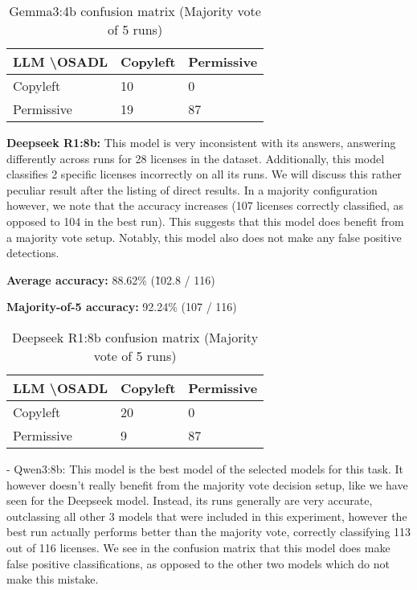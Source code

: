 \begin{table}[h]
	\caption{Gemma3:4b confusion matrix (Majority vote of 5 runs)}
	\label{tab:gemma3-confmatrix}
	\centering
	\begin{tabular}{l|ll}
		\hline
		\textbf{LLM \textbackslash OSADL} & Copyleft & Permissive \\ \hline
		Copyleft & 10 & 0 \\
		Permissive & 19 & 87 \\\hline
	\end{tabular}
\end{table}

\textbf{Deepseek R1:8b:} This model is very inconsistent with its answers, answering differently across runs for 28 licenses in the dataset. Additionally, this model classifies 2 specific licenses incorrectly on all its runs. We will discuss this rather peculiar result after the listing of direct results. In a majority configuration however, we note that the accuracy increases (107 licenses correctly classified, as opposed to 104 in the best run). This suggests that this model does benefit from a majority vote setup. Notably, this model also does not make any false positive detections.

\textbf{Average accuracy:} 88.62\% (\~ 102.8 / 116)

\textbf{Majority-of-5 accuracy:} 92.24\% (107 / 116)

\begin{table}[h]
	\caption{Deepseek R1:8b confusion matrix (Majority vote of 5 runs)}
	\label{tab:deepseekr1-confmatrix}
	\centering
	\begin{tabular}{l|ll}
		\hline
		\textbf{LLM \textbackslash OSADL} & Copyleft & Permissive \\ \hline
		Copyleft & 20 & 0 \\
		Permissive & 9 & 87 \\\hline
	\end{tabular}
\end{table}

- Qwen3:8b: This model is the best model of the selected models for this task. It however doesn't really benefit from the majority vote decision setup, like we have seen for the Deepseek model. Instead, its runs generally are very accurate, outclassing all other 3 models that were included in this experiment, however the best run actually performs better than the majority vote, correctly classifying 113 out of 116 licenses. We see in the confusion matrix that this model does make false positive classifications, as opposed to the other two models which do not make this mistake.

